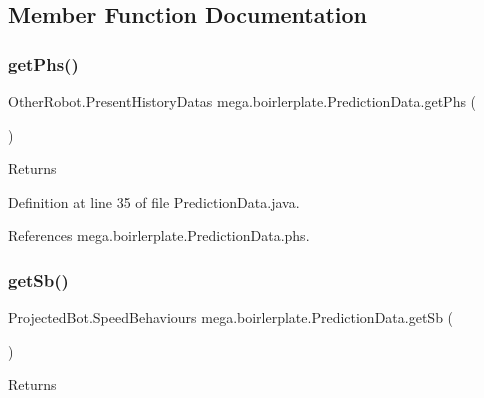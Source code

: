 \subsection{Member Function Documentation}
\mbox{\label{classmega_1_1boirlerplate_1_1_prediction_data_a974e0a518cc3c2cfc49f8a0705ec4330}} 
\subsubsection{\texorpdfstring{get\+Phs()}{getPhs()}}
{\footnotesize\ttfamily Other\+Robot.\+Present\+History\+Datas mega.\+boirlerplate.\+Prediction\+Data.\+get\+Phs (\begin{DoxyParamCaption}{ }\end{DoxyParamCaption})}

\begin{DoxyReturn}{Returns}

\end{DoxyReturn}


Definition at line 35 of file Prediction\+Data.\+java.



References mega.\+boirlerplate.\+Prediction\+Data.\+phs.

\mbox{\label{classmega_1_1boirlerplate_1_1_prediction_data_a6402313a3837d4995ea5031d082a8fde}} 
\subsubsection{\texorpdfstring{get\+Sb()}{getSb()}}
{\footnotesize\ttfamily Projected\+Bot.\+Speed\+Behaviours mega.\+boirlerplate.\+Prediction\+Data.\+get\+Sb (\begin{DoxyParamCaption}{ }\end{DoxyParamCaption})}

\begin{DoxyReturn}{Returns}

\end{DoxyReturn}


